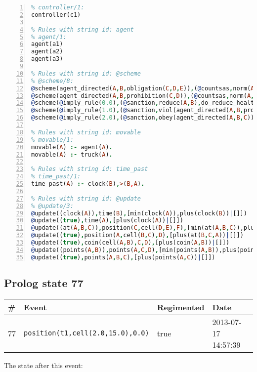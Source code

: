 \documentclass[11pt]{article}\usepackage[utf8]{inputenc}\usepackage{geometry}
\begin{document}
\begin{lstlisting}[language=Prolog, numbers=left]
% Rules with string id: controller
% controller/1:
controller(c1)

% Rules with string id: agent
% agent/1:
agent(a1)
agent(a2)
agent(a3)

% Rules with string id: @scheme
% @scheme/8:
@scheme(agent_directed(A,B,obligation(C,D,E)),(@countsas,norm(A,B,F,obligation(C,D,E)),F),false,(listTrue(C)),(time_past(D)),false,[plus(viol(agent_directed(A,B,obligation(C,D,E))))|[]],[plus(obey(agent_directed(A,B,obligation(C,D,E))))|[]])
@scheme(agent_directed(A,B,prohibition(C,D)),(@countsas,norm(A,B,E,prohibition(C,D)),E),(listTrue(C)),false,(false),false,[plus(viol(agent_directed(A,B,prohibition(C,D))))|[]],[plus(obey(agent_directed(A,B,prohibition(C,D))))|[]])
@scheme(@imply_rule(0.0),(@sanction,reduce(A,B),do_reduce_health(A,B),notifyAgent(A,changed(status))),true,false,false,false,[min(reduce(A,B))|[]],[])
@scheme(@imply_rule(1.0),(@sanction,viol(agent_directed(A,B,prohibition(C,D))),do_sanction(D)),true,false,false,false,[min(viol(agent_directed(A,B,prohibition(C,D))))|[]],[])
@scheme(@imply_rule(2.0),(@sanction,obey(agent_directed(A,B,C))),true,false,false,false,[min(obey(agent_directed(A,B,C)))|[]],[])

% Rules with string id: movable
% movable/1:
movable(A) :- agent(A).
movable(A) :- truck(A).

% Rules with string id: time_past
% time_past/1:
time_past(A) :- clock(B),>(B,A).

% Rules with string id: @update
% @update/3:
@update((clock(A)),time(B),[min(clock(A)),plus(clock(B))|[]])
@update((true),time(A),[plus(clock(A))|[]])
@update((at(A,B,C)),position(C,cell(D,E),F),[min(at(A,B,C)),plus(at(D,E,C))|[]])
@update((true),position(A,cell(B,C),D),[plus(at(B,C,A))|[]])
@update((true),coin(cell(A,B),C,D),[plus(coin(A,B))|[]])
@update((points(A,B)),points(A,C,D),[min(points(A,B)),plus(points(A,D))|[]])
@update((true),points(A,B,C),[plus(points(A,C))|[]])

\end{lstlisting}
\clearpage 
\subsection{Prolog state 77}
\begin{table}[ht]
\centering 
\begin{tabular}{l l l l} 
\textbf{\#} & \textbf{Event} & \textbf{Regimented} & \textbf{Date} \\ [0.5ex] 
\hline
77&\texttt{position(t1,cell(2.0,15.0),0.0)}&true&2013-07-17 14:57:39\\ [1ex] \hline\end{tabular}
\end{table}
The state after this event:
\end{document}
